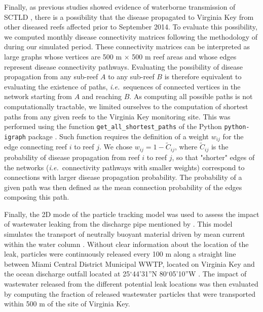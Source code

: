 \documentclass[preprint,12pt,authoryear]{elsarticle}
\newcommand{\ie}{{\it i.e.}\ }
\begin{document}
Finally, as previous studies showed evidence of waterborne transmission of SCTLD \citep{aeby2019pathogenesis, dobbelaere2020coupled,eaton2021measuring, meiling2021variable}, there is a possibility that the disease propagated to Virginia Key from other diseased reefs affected prior to September 2014. To evaluate this possibility, we computed monthly disease connectivity matrices following the methodology of \cite{dobbelaere2020coupled} during our simulated period. These connectivity matrices can be interpreted as large graphs whose vertices are 500 m $\times$ 500 m reef areas and whose edges represent disease connectivity pathways. Evaluating the possibility of disease propagation from any sub-reef $A$ to any sub-reef $B$ is therefore equivalent to evaluating the existence of paths, \ie sequences of connected vertices in the network starting from $A$ and reaching $B$. As computing all possible paths is not computationally tractable, we limited ourselves to the computation of shortest paths from any given reefs to the Virginia Key monitoring site. This was performed using the function \texttt{get\_all\_shortest\_paths} of the Python \texttt{python-igraph} package \citep{csardi2006igraph}. Such function requires the definition of a weight $w_{ij}$ for the edge connecting reef $i$ to reef $j$. We chose $w_{ij} = 1-\tilde{C}_{ij}$, where $\tilde{C}_{ij}$ is the probability of disease propagation from reef $i$ to reef $j$, so that "shorter" edges of the networks (\ie connectivity pathways with smaller weights) correspond to connections with larger disease propagation probability. The probability of a given path was then defined as the mean connection probability of the edges composing this path.

Finally, the 2D mode of the particle tracking model was used to assess the impact of wastewater leaking from the discharge pipe mentioned by \cite{gintert2019regional}. This model simulates the transport of neutrally buoyant material driven by mean current within the water column \citep{dobbelaere2020coupled}. Without clear information about the location of the leak, particles were continuously released every 100 m along a straight line between Miami Central District Municipal WWTP, located on Virginia Key and the ocean discharge outfall located at 25$^\circ$44'31''N 80$^\circ$05'10''W \citep{koopman2006ocean}. The impact of wastewater released from the different potential leak locations was then evaluated by computing the fraction of released wastewater particles that were transported within 500 m of the site of Virginia Key.
\end{document}
